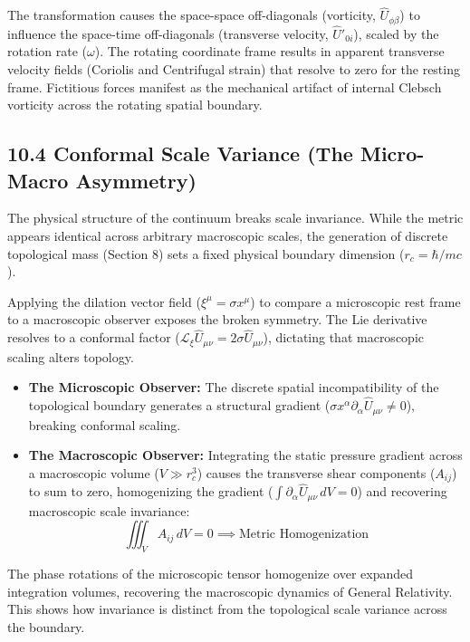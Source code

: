 The transformation causes the space-space off-diagonals (vorticity, $\hat{U}_{\phi\beta}$) to influence the space-time off-diagonals (transverse velocity, $\hat{U}'_{0i}$), scaled by the rotation rate ($\omega$). The rotating coordinate frame results in apparent transverse velocity fields (Coriolis and Centrifugal strain) that resolve to zero for the resting frame. Fictitious forces manifest as the mechanical artifact of internal Clebsch vorticity across the rotating spatial boundary. 

\subsection*{10.4 Conformal Scale Variance (The Micro-Macro Asymmetry)}
The physical structure of the continuum breaks scale invariance. While the metric appears identical across arbitrary macroscopic scales, the generation of discrete topological mass (Section 8) sets a fixed physical boundary dimension ($r_c = \hbar/mc$).

Applying the dilation vector field ($\xi^\mu = \sigma x^\mu$) to compare a microscopic rest frame to a macroscopic observer exposes the broken symmetry. 
The Lie derivative resolves to a conformal factor ($\mathcal{L}_\xi \hat{U}_{\mu\nu} = 2\sigma\hat{U}_{\mu\nu}$), dictating that macroscopic scaling alters topology. 

\begin{itemize}
    \item \textbf{The Microscopic Observer:} The discrete spatial incompatibility of the topological boundary generates a structural gradient ($\sigma x^\alpha \partial_\alpha \hat{U}_{\mu\nu} \neq 0$), breaking conformal scaling. 
    \item \textbf{The Macroscopic Observer:} Integrating the static pressure gradient across a macroscopic volume ($V \gg r_c^3$) causes the transverse shear components ($A_{ij}$) to sum to zero, homogenizing the gradient ($\int \partial_\alpha \hat{U}_{\mu\nu} \, dV = 0$) and recovering macroscopic scale invariance: 
    \begin{equation}
        \iiint_V A_{ij} \, dV = 0 \implies \text{Metric Homogenization}
    \end{equation}
\end{itemize}
The phase rotations of the microscopic tensor homogenize over expanded integration volumes, recovering the macroscopic dynamics of General Relativity. This shows how invariance is distinct from the topological scale variance across the boundary.

